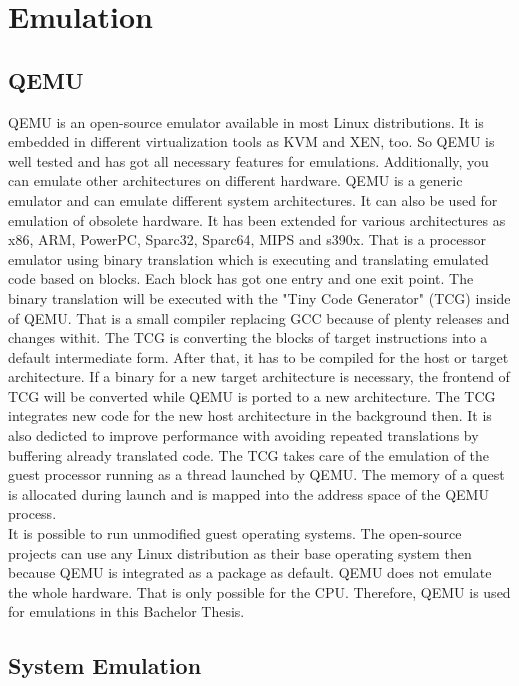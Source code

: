 
\chapter{Emulation}\label{ch:emulation}

\section{QEMU}

QEMU is an open-source emulator available in most Linux distributions. It is embedded in different virtualization tools as KVM and XEN, too. So QEMU is well tested and has got all necessary features for emulations. 
Additionally, you can emulate other architectures on different hardware. QEMU is a generic emulator and can emulate different system architectures. It can also be used for emulation of obsolete hardware\cite[~p.24]{Opsahl2013}. 
It has been extended for various architectures as x86, ARM, PowerPC, Sparc32, Sparc64, MIPS and s390x.
That is a processor emulator using binary translation\cite{Butt2011} which is executing and translating emulated code based on blocks. Each block has got one entry and one exit point\cite[~p.5]{Wang2010}. 
The binary translation will be executed with the "Tiny Code Generator" (TCG) inside of QEMU. 
That is a small compiler replacing GCC because of plenty releases and changes withit. The TCG is converting the blocks of target instructions into a default intermediate form. 
After that, it has to be compiled for the host or target architecture. 
If a binary for a new target architecture is necessary, the frontend of TCG will be converted while QEMU is ported to a new architecture. 
The TCG integrates new code for the new host architecture in the background then. It is also dedicted to improve performance with avoiding repeated translations by buffering already translated code\cite{Cota2017}. 
The TCG takes care of the emulation of the guest processor running as a thread launched by QEMU. The memory of a quest is allocated during launch and is mapped into the address space of the QEMU process\cite[~p.29]{Opsahl2013}.\\
It is possible to run unmodified guest operating systems. The open-source projects can use any Linux distribution as their base operating system then because QEMU is integrated as a package as default. 
QEMU does not emulate the whole hardware. That is only possible for the CPU. Therefore, QEMU is used for emulations in this Bachelor Thesis.

\section{System Emulation}

